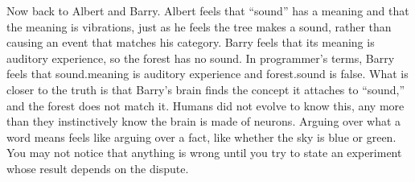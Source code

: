 Now back to Albert and Barry. Albert feels that ``sound'' has a meaning and that the meaning is vibrations, just as he feels the tree makes a sound, rather than causing an event that matches his category. Barry feels that its meaning is auditory experience, so the forest has no sound. In programmer's terms, Barry feels that sound.meaning is auditory experience and forest.sound is false. What is closer to the truth is that Barry's brain finds the concept it attaches to ``sound,'' and the forest does not match it. Humans did not evolve to know this, any more than they instinctively know the brain is made of neurons. Arguing over what a word means feels like arguing over a fact, like whether the sky is blue or green. You may not notice that anything is wrong until you try to state an experiment whose result depends on the dispute.

